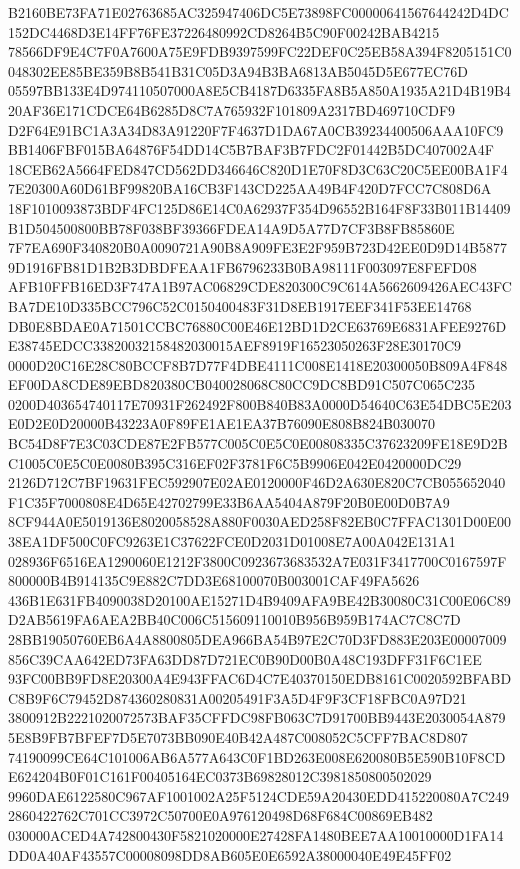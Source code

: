 \documentclass[UTF8,fontset=fandol,zihao=-4,a4paper]{ctexart}
\begin{document}
{{B2160BE73FA71E02763685AC325947406DC5E73898FC00000641567644242D4DC152DC4468D3E14FF76FE37226480992CD8264B5C90F00242BAB4215
78566DF9E4C7F0A7600A75E9FDB9397599FC22DEF0C25EB58A394F8205151C0048302EE85BE359B8B541B31C05D3A94B3BA6813AB5045D5E677EC76D
05597BB133E4D974110507000A8E5CB4187D6335FA8B5A850A1935A21D4B19B420AF36E171CDCE64B6285D8C7A765932F101809A2317BD469710CDF9
D2F64E91BC1A3A34D83A91220F7F4637D1DA67A0CB39234400506AAA10FC9BB1406FBF015BA64876F54DD14C5B7BAF3B7FDC2F01442B5DC407002A4F
18CEB62A5664FED847CD562DD346646C820D1E70F8D3C63C20C5EE00BA1F47E20300A60D61BF99820BA16CB3F143CD225AA49B4F420D7FCC7C808D6A
18F1010093873BDF4FC125D86E14C0A62937F354D96552B164F8F33B011B14409B1D504500800BB78F038BF39366FDEA14A9D5A77D7CF3B8FB85860E
7F7EA690F340820B0A0090721A90B8A909FE3E2F959B723D42EE0D9D14B58779D1916FB81D1B2B3DBDFEAA1FB6796233B0BA98111F003097E8FEFD08
AFB10FFB16ED3F747A1B97AC06829CDE820300C9C614A5662609426AEC43FCBA7DE10D335BCC796C52C0150400483F31D8EB1917EEF341F53EE14768
DB0E8BDAE0A71501CCBC76880C00E46E12BD1D2CE63769E6831AFEE9276DE38745EDCC33820032158482030015AEF8919F16523050263F28E30170C9
0000D20C16E28C80BCCF8B7D77F4DBE4111C008E1418E20300050B809A4F848EF00DA8CDE89EBD820380CB040028068C80CC9DC8BD91C507C065C235
0200D403654740117E70931F262492F800B840B83A0000D54640C63E54DBC5E203E0D2E0D20000B43223A0F89FE1AE1EA37B76090E808B824B030070
BC54D8F7E3C03CDE87E2FB577C005C0E5C0E00808335C37623209FE18E9D2BC1005C0E5C0E0080B395C316EF02F3781F6C5B9906E042E0420000DC29
2126D712C7BF19631FEC592907E02AE0120000F46D2A630E820C7CB055652040F1C35F7000808E4D65E42702799E33B6AA5404A879F20B0E00D0B7A9
8CF944A0E5019136E8020058528A880F0030AED258F82EB0C7FFAC1301D00E0038EA1DF500C0FC9263E1C37622FCE0D2031D01008E7A00A042E131A1
028936F6516EA1290060E1212F3800C0923673683532A7E031F3417700C0167597F800000B4B914135C9E882C7DD3E68100070B003001CAF49FA5626
436B1E631FB4090038D20100AE15271D4B9409AFA9BE42B30080C31C00E06C89D2AB5619FA6AEA2BB40C006C515609110010B956B959B174AC7C8C7D
28BB19050760EB6A4A8800805DEA966BA54B97E2C70D3FD883E203E00007009856C39CAA642ED73FA63DD87D721EC0B90D00B0A48C193DFF31F6C1EE
93FC00BB9FD8E20300A4E943FFAC6D4C7E40370150EDB8161C0020592BFABDC8B9F6C79452D874360280831A00205491F3A5D4F9F3CF18FBC0A97D21
3800912B2221020072573BAF35CFFDC98FB063C7D91700BB9443E2030054A8795E8B9FB7BFEF7D5E7073BB090E40B42A487C008052C5CFF7BAC8D807
74190099CE64C101006AB6A577A643C0F1BD263E008E620080B5E590B10F8CDE624204B0F01C161F00405164EC0373B69828012C3981850800502029
9960DAE6122580C967AF1001002A25F5124CDE59A20430EDD415220080A7C2492860422762C701CC3972C50700E0A976120498D68F684C00869EB482
030000ACED4A742800430F5821020000E27428FA1480BEE7AA10010000D1FA14DD0A40AF43557C00008098DD8AB605E0E6592A38000040E49E45FF02
}}
\end{document}
